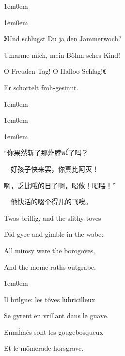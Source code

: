 \documentclass[
  12pt,
  twoside,
  openright,
  oldfontcommands,
]{memoir}
\begin{document}
\hfill\break

\begin{adjustwidth}{1em}{0em}

\begin{adjustwidth}{1em}{0em}

》Und schlugst Du ja den Jammerwoch?

Umarme mich, mein Bõhm\textquotesingle{} sches Kind!

O Freuden-Tag! O Halloo-Schlag!《

Er schortelt froh-gesinnt.

\end{adjustwidth}

\end{adjustwidth}

\hfill\break

\begin{adjustwidth}{1em}{0em}

\begin{adjustwidth}{1em}{0em}

\begin{adjustwidth}{1em}{0em}

``你果然斩了那炸脖{\gebfont ꪡ}了吗？

　好孩子快来罢，你真比阿灭！

啊，乏比哦的日子啊，喝攸！喝喂！''

　他快活的啜个得儿的飞唉。

\end{adjustwidth}

\end{adjustwidth}

\end{adjustwidth}

\hfill\break

\textquotesingle Twas brillig, and the slithy toves

Did gyre and gimble in the wabe:

All mimsy were the borogoves,

And the mome raths outgrabe.

\hfill\break

\begin{adjustwidth}{1em}{0em}

Il brilgue: les tôves luhricilleux

Se gyrent en vrillant dans le guave.

EnmÎmés sont les gougebosqueux

Et le mômerade horsgrave.

\end{adjustwidth}
\end{document}
